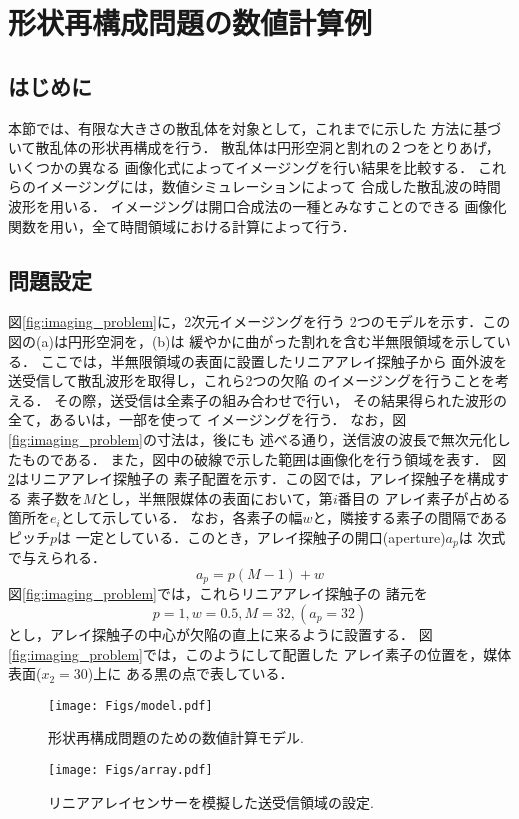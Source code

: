 \section{形状再構成問題の数値計算例}
\subsection{はじめに}
本節では、有限な大きさの散乱体を対象として，これまでに示した
方法に基づいて散乱体の形状再構成を行う．
散乱体は円形空洞と割れの２つをとりあげ，いくつかの異なる
画像化式によってイメージングを行い結果を比較する．
これらのイメージングには，数値シミュレーションによって
合成した散乱波の時間波形を用いる．
イメージングは開口合成法の一種とみなすことのできる
画像化関数を用い，全て時間領域における計算によって行う．
\subsection{問題設定}
図\ref{fig:imaging_problem}に，2次元イメージングを行う
2つのモデルを示す．この図の(a)は円形空洞を，(b)は
緩やかに曲がった割れを含む半無限領域を示している．
ここでは，半無限領域の表面に設置したリニアアレイ探触子から
面外波を送受信して散乱波形を取得し，これら2つの欠陥
のイメージングを行うことを考える．
その際，送受信は全素子の組み合わせで行い，
その結果得られた波形の全て，あるいは，一部を使って
イメージングを行う．
なお，図\ref{fig:imaging_problem}の寸法は，後にも
述べる通り，送信波の波長で無次元化したものである．
また，図中の破線で示した範囲は画像化を行う領域を表す．
図\ref{fig:linear_array}はリニアアレイ探触子の
素子配置を示す．この図では，アレイ探触子を構成する
素子数を$M$とし，半無限媒体の表面において，第$i$番目の
アレイ素子が占める箇所を$e_i$として示している．
なお，各素子の幅$w$と，隣接する素子の間隔であるピッチ$p$は
一定としている．このとき，アレイ探触子の開口(aperture)$a_p$は
次式で与えられる．
\begin{equation}
	a_p=p(M-1)+w
	\label{eqn:aperture}
\end{equation}
図\ref{fig:imaging_problem}では，これらリニアアレイ探触子の
諸元を
\[
	p=1, w=0.5, M=32, (a_p=32)
\]
とし，アレイ探触子の中心が欠陥の直上に来るように設置する．
図\ref{fig:imaging_problem}では，このようにして配置した
アレイ素子の位置を，媒体表面($x_2=30$)上に
ある黒の点で表している．
\begin{figure}[h]
	\begin{center}
	\texttt{[image: Figs/model.pdf]} 
	\end{center}
	\caption{ 形状再構成問題のための数値計算モデル.}
	\label{fig:imging_problem}
\end{figure}
\begin{figure}[h]
	\begin{center}
	\texttt{[image: Figs/array.pdf]} 
	\end{center}
	\caption{リニアアレイセンサーを模擬した送受信領域の設定.} 
	\label{fig:linear_array}
\end{figure}
